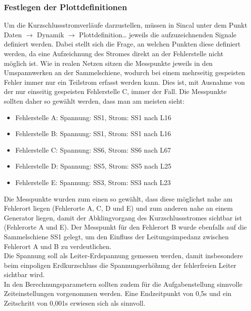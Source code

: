 \documentclass{scrartcl}
\begin{document}
\begin{onehalfspace}
\subsubsection{Festlegen der Plottdefinitionen}
Um die Kurzschlussstromverläufe darzustellen, müssen in Sincal unter dem Punkt Daten $\rightarrow$ Dynamik $\rightarrow$ Plottdefinition… jeweils die aufzuzeichnenden Signale definiert werden. Dabei stellt sich die Frage, an welchen Punkten diese definiert werden, da eine Aufzeichnung des Stromes direkt an der Fehlerstelle nicht möglich ist. Wie in realen Netzen sitzen die Messpunkte jeweils in den Umspannwerken an der Sammelschiene, wodurch bei einem mehrseitig gespeisten Fehler immer nur ein Teilstrom erfasst werden kann. Dies ist, mit Ausnahme von der nur einseitig gespeisten Fehlerstelle C, immer der Fall. Die Messpunkte sollten daher so gewählt werden, dass man \glqq am meisten sieht\grqq:

\begin{itemize}
\item Fehlerstelle A: Spannung: SS1, Strom: SS1 nach L16
\item Fehlerstelle B: Spannung: SS1, Strom: SS1 nach L16
\item Fehlerstelle C: Spannung: SS6, Strom: SS6 nach L67
\item Fehlerstelle D: Spannung: SS5, Strom: SS5 nach L25
\item Fehlerstelle E: Spannung: SS3, Strom: SS3 nach L23
\end{itemize}

Die Messpunkte wurden zum einen so gewählt, dass diese möglichst nahe am Fehlerort liegen (Fehlerorte A, C, D und E) und zum anderen nahe an einem Generator liegen, damit der Abklingvorgang des Kurzschlussstromes sichtbar ist (Fehlerorte A und E). Der Messpunkt für den Fehlerort B wurde ebenfalls auf die Sammelschiene SS1 gelegt, um den Einfluss der Leitungsimpedanz zwischen Fehlerort A und B zu verdeutlichen. \\
Die Spannung soll als Leiter-Erdspannung gemessen werden, damit insbesondere beim einpoligen Erdkurzschluss die Spannungserhöhung der fehlerfreien Leiter sichtbar wird. \\
In den Berechnungsparametern sollten zudem für die Aufgabenstellung sinnvolle Zeiteinstellungen vorgenommen werden. Eine Endzeitpunkt von 0,5s und ein Zeitschritt von 0,001s erwiesen sich als sinnvoll.



\end{onehalfspace}
\end{document}
